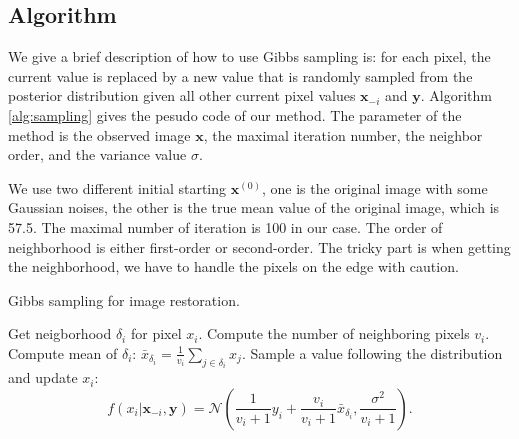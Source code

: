 \subsection{Algorithm}
We give a brief description of how to use Gibbs sampling is:
for each pixel, the current value is replaced by a new value that is randomly sampled from the posterior distribution given all other current pixel values $\mathbf{x}_{-i}$ and $\mathbf{y}$. Algorithm \ref{alg:sampling} gives the pesudo code of our method. The parameter of the method is the observed image $\mathbf{x}$, the maximal iteration number, the neighbor order, and the variance value $\sigma$.

We use two different initial starting $\mathbf{x}^{(0)}$, one is the original image with some Gaussian noises, the other is the true mean value of the original image, which is 57.5. The maximal number of iteration is 100 in our case. The order of neighborhood is either first-order or second-order. The tricky part is when getting the neighborhood, we have to handle the pixels on the edge with caution. 

\begin{algorithm}
\caption{Gibbs sampling for image restoration.}\label{alg:sampling}
\begin{algorithmic}[1]
		\State Get neigborhood $\delta_i$ for pixel $x_i$.
		\State Compute the number of neighboring pixels $v_i$.
		\State Compute mean of $\delta_i$: $\bar{x}_{\delta_i} = \frac{1}{v_i}\sum_{j\in\delta_i}{x_j}$.
    	\State Sample a value following the distribution and update $x_i$: $$f(x_i|\mathbf{x}_{-i}, \mathbf{y}) = \mathcal{N}\left(\frac{1}{v_i+1}y_i+\frac{v_i}{v_i+1}\bar{x}_{\delta_i},\frac{\sigma^2}{v_i+1}\right).$$
	\EndFor
\EndFor
\EndFunction
\end{algorithmic}
\end{algorithm}

